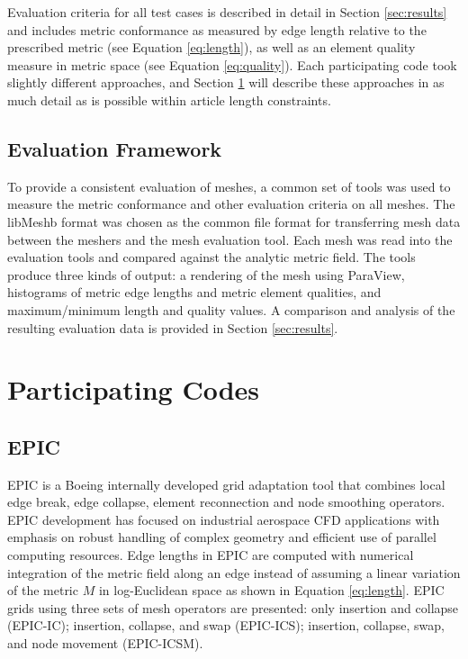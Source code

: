 \documentclass[3p,times,procedia,number]{elsarticle}
\begin{document}
Evaluation criteria for all test cases is described in detail in Section \ref{sec:results} and includes metric conformance
as measured by edge length relative to the prescribed metric (see Equation \ref{eq:length}),
as well as an element quality measure in metric space (see Equation \ref{eq:quality}).
Each participating code took slightly different approaches, and Section \ref{sec:codes} will
describe these approaches in as much detail as is possible within article length constraints.

\subsection{Evaluation Framework}

To provide a consistent evaluation of meshes, a common set of tools was used to measure the metric conformance and other evaluation criteria on all meshes.
The libMeshb\cite{libMeshb-website} format was chosen as the common file format for transferring mesh data between the meshers and the mesh evaluation tool.
Each mesh was read into the evaluation tools and compared against the analytic metric field.
The tools produce three kinds of output: a rendering of the mesh using ParaView,\cite{paraview-book}
histograms of metric edge lengths and metric element qualities, and maximum/minimum length
and quality values.
A comparison and analysis of the resulting evaluation data is provided in Section \ref{sec:results}.

\section{Participating Codes}
\label{sec:codes}

\subsection{EPIC}

EPIC is a Boeing internally developed grid adaptation tool that combines
local edge break, edge collapse, element reconnection and node smoothing
operators.\cite{michal-krakos-aniso-adapt-edge}
EPIC development has focused on industrial aerospace CFD
applications with emphasis on robust handling of complex geometry and
efficient use of parallel computing resources. Edge lengths in EPIC are
computed with numerical integration of the metric field along an edge
instead of assuming a linear variation of the metric $M$ in log-Euclidean space
as shown in Equation \ref{eq:length}.
EPIC grids using three sets of mesh operators are presented:
only insertion and collapse (EPIC-IC); insertion, collapse, and swap (EPIC-ICS);
insertion, collapse, swap, and node movement (EPIC-ICSM).
\end{document}
